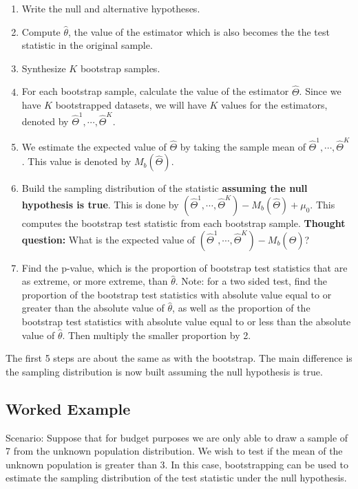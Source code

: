 \documentclass[
]{book}
\providecommand{\tightlist}{%
  \setlength{\itemsep}{0pt}\setlength{\parskip}{0pt}}
\theoremstyle{definition}
\theoremstyle{definition}
\theoremstyle{definition}
\theoremstyle{definition}
\theoremstyle{remark}
\begin{document}
\begin{enumerate}
\def\labelenumi{\arabic{enumi}.}
\tightlist
\item
  Write the null and alternative hypotheses.
\item
  Compute \(\hat{\theta}\), the value of the estimator which is also becomes the the test statistic in the original sample.
\item
  Synthesize \(K\) bootstrap samples.
\item
  For each bootstrap sample, calculate the value of the estimator \(\hat{\Theta}\). Since we have \(K\) bootstrapped datasets, we will have \(K\) values for the estimators, denoted by \(\hat{\Theta}^{1}, \cdots, \hat{\Theta}^{K}\).
\item
  We estimate the expected value of \(\hat{\Theta}\) by taking the sample mean of \(\hat{\Theta}^{1}, \cdots, \hat{\Theta}^{K}\). This value is denoted by \(M_b(\hat{\Theta})\).
\item
  Build the sampling distribution of the statistic \textbf{assuming the null hypothesis is true}. This is done by \((\hat{\Theta}^{1}, \cdots, \hat{\Theta}^{K}) - M_b(\hat{\Theta}) + \mu_0\). This computes the bootstrap test statistic from each bootstrap sample.
  \textbf{Thought question:} What is the expected value of \((\hat{\Theta}^{1}, \cdots, \hat{\Theta}^{K}) - M_b(\hat{\Theta})\)?
\item
  Find the p-value, which is the proportion of bootstrap test statistics that are as extreme, or more extreme, than \(\hat{\theta}\). Note: for a two sided test, find the proportion of the bootstrap test statistics with absolute value equal to or greater than the absolute value of \(\hat{\theta}\), as well as the proportion of the bootstrap test statistics with absolute value equal to or less than the absolute value of \(\hat{\theta}\). Then multiply the smaller proportion by 2.
\end{enumerate}

The first 5 steps are about the same as with the bootstrap. The main difference is the sampling distribution is now built assuming the null hypothesis is true.

\hypertarget{boottest1}{%
\subsection{Worked Example}\label{boottest1}}

Scenario: Suppose that for budget purposes we are only able to draw a sample of 7 from the unknown population distribution. We wish to test if the mean of the unknown population is greater than 3. In this case, bootstrapping can be used to estimate the sampling distribution of the test statistic under the null hypothesis.
\end{document}

